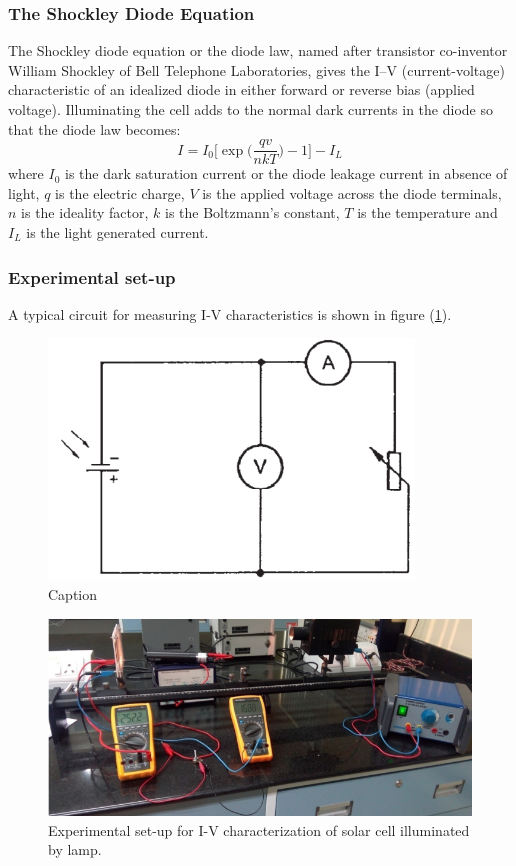 \documentclass[%
 aip,
 amsmath,amssymb,
 reprint, floatfix%
]{revtex4-2}
\begin{document}
    \subsubsection{The Shockley Diode Equation}
        The Shockley diode equation or the diode law, named after transistor co-inventor William Shockley of Bell Telephone Laboratories, gives the I–V (current-voltage) characteristic of an idealized diode in either forward or reverse bias (applied voltage). Illuminating the cell adds to the normal dark currents in the diode so that the diode law becomes:
        \begin{equation}
            I = I_0 \Big[ \exp \big( \dfrac{qv}{nkT}\big) -1 \Big] - I_L
        \end{equation}
        where $I_0$ is the dark saturation current or the diode leakage current in absence of light, $q$ is the electric charge, $V$ is the applied voltage across the diode terminals, $n$ is the ideality factor, $k$ is the Boltzmann's constant, $T$ is the temperature and $I_L$ is the light generated current.
    \subsubsection{Experimental set-up}
        A typical circuit for measuring I-V characteristics is shown in figure (\ref{fig:iv-cir}).
        \begin{figure}
            \centering
            \includegraphics{Figures/ivcircuit.png}
            \caption{Caption}
            \label{fig:iv-cir}
        \end{figure}
        \begin{figure}
            \centering
            \includegraphics[scale = 0.55]{Figures/ivarr.png}
            \caption{Experimental set-up for I-V characterization of solar cell illuminated by lamp.}
            \label{fig:ivarr}
        \end{figure}
\end{document}
